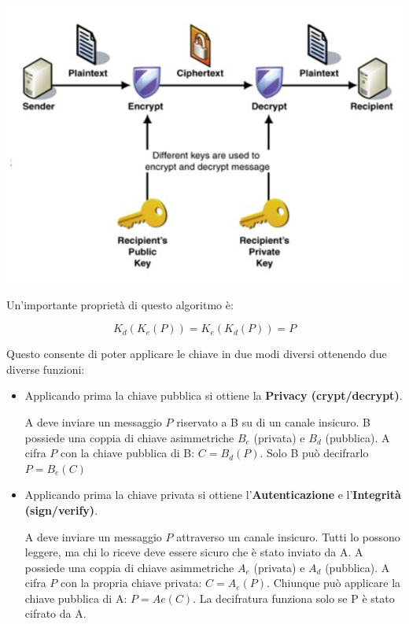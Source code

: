             \begin{center}
                \includegraphics[scale=0.5]{chapters/7/assets/schema_q.png}
            \end{center}

            Un'importante proprietà di questo algoritmo è:
            
            \begin{equation*}
                K_d(K_e(P)) = K_e(K_d(P)) = P
            \end{equation*}

            Questo consente di poter applicare le chiave in due modi diversi ottenendo due diverse funzioni:
            \begin{itemize}
                \item Applicando prima la chiave pubblica si ottiene la \textbf{Privacy (crypt/decrypt)}.
                
                A deve inviare un messaggio $P$ riservato a B su di un canale insicuro. B possiede una coppia di chiave asimmetriche $B_e$ (privata) e $B_d$ (pubblica). A cifra $P$ con la chiave pubblica di B: $C = B_d(P)$. Solo B può decifrarlo $P = B_e(C)$
                \item Applicando prima la chiave privata si ottiene l'\textbf{Autenticazione} e l'\textbf{Inte\-grità (sign/verify)}.
                
                A deve inviare un messaggio $P$ attraverso un canale insicuro. Tutti lo possono leggere, ma chi lo riceve deve essere sicuro che è stato inviato da A.
                A possiede una coppia di chiave asimmetriche $A_e$ (privata) e $A_d$ (pubblica).
                A cifra $P$ con la propria chiave privata: $C = A_e(P)$. Chiunque può applicare la chiave pubblica di A: $P = Ae(C)$.
                La decifratura funziona solo se P è stato cifrato da A.
            \end{itemize}

